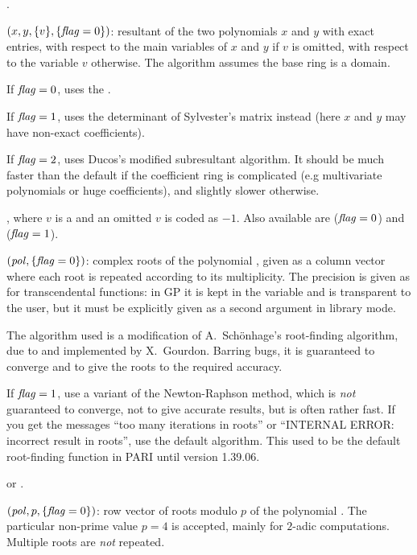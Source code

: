 .

$(x,y,\{v\},\{\hbox{\it f\kern0pt lag\/}=0\})$: resultant of the two
polynomials $x$ and $y$ with exact entries, with respect to the main
variables of $x$ and $y$ if $v$ is omitted, with respect to the variable $v$
otherwise. The algorithm assumes the base ring is a domain.

If $\hbox{\it f\kern0pt lag\/}=0$, uses the .

If $\hbox{\it f\kern0pt lag\/}=1$, uses the determinant of Sylvester's matrix instead (here $x$ and
$y$ may have non-exact coefficients).

If $\hbox{\it f\kern0pt lag\/}=2$, uses Ducos's modified subresultant algorithm. It should be much
faster than the default if the coefficient ring is complicated (e.g
multivariate polynomials or huge coefficients), and slightly slower
otherwise.

, where $v$ is a  and an omitted $v$
is coded as $-1$. Also available are  ($\hbox{\it f\kern0pt lag\/}=0$) and
 ($\hbox{\it f\kern0pt lag\/}=1$).

$(\hbox{\it pol\/},\{\hbox{\it f\kern0pt lag\/}=0\})$: complex roots of the polynomial
, given as a column vector where each root is repeated according to
its multiplicity. The precision is given as for transcendental functions: in
GP it is kept in the variable  and is transparent to the
user, but it must be explicitly given as a second argument in library mode.

The algorithm used is a modification of A.~Sch\"onhage's
root-finding algorithm, due to and implemented by X.~Gourdon. Barring bugs, it
is guaranteed to converge and to give the roots to the required accuracy.

If $\hbox{\it f\kern0pt lag\/}=1$, use a variant of the Newton-Raphson method, which is \emph{not}
guaranteed to converge, not to give accurate results, but is often rather
fast. If you get the messages ``too many iterations in roots'' or ``INTERNAL
ERROR: incorrect result in roots'', use the default algorithm. This used to
be the default root-finding function in PARI until version 1.39.06.

 or .

$(\hbox{\it pol\/},p,\{\hbox{\it f\kern0pt lag\/}=0\})$: row vector of roots modulo
$p$ of the polynomial . The particular non-prime value $p=4$ is
accepted, mainly for $2$-adic computations. Multiple roots are \emph{not}
repeated.

